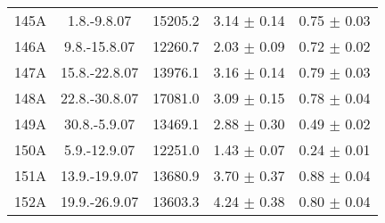 \documentclass[a4paper,12pt]{article}
\begin{document}
\begin{center}
\begin{longtable}{|c|c|c|c|c|}
    145A	&	1.8.-9.8.07	&	15205.2	&	3.14 $\pm$ 0.14	&	0.75 $\pm$ 0.03	\\
    146A	&	9.8.-15.8.07	&	12260.7	&	2.03 $\pm$ 0.09	&	0.72 $\pm$ 0.02	\\
    147A	&	15.8.-22.8.07	&	13976.1	&	3.16 $\pm$ 0.14	&	0.79 $\pm$ 0.03	\\
    148A	&	22.8.-30.8.07	&	17081.0	&	3.09 $\pm$ 0.15	&	0.78 $\pm$ 0.04	\\
    149A	&	30.8.-5.9.07	&	13469.1	&	2.88 $\pm$ 0.30	&	0.49 $\pm$ 0.02	\\
    150A	&	5.9.-12.9.07	&	12251.0	&	1.43 $\pm$ 0.07	&	0.24 $\pm$ 0.01	\\
    151A	&	13.9.-19.9.07	&	13680.9	&	3.70 $\pm$ 0.37	&	0.88 $\pm$ 0.04	\\
    152A	&	19.9.-26.9.07	&	13603.3	&	4.24 $\pm$ 0.38	&	0.80 $\pm$ 0.04	\\

  \end{longtable}
\end{center}

\clearpage
\end{document}
